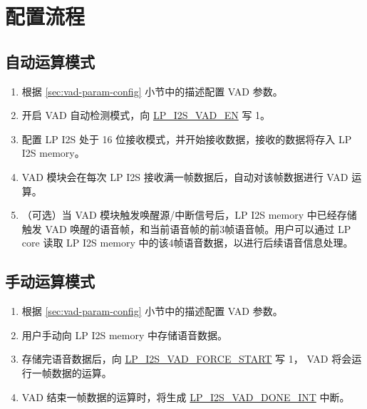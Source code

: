 \documentclass[main\_\_CN.tex]{subfiles}
\begin{document}

\section{配置流程}
\label{sec:vad-prog-procedures}


\subsection{自动运算模式}

\begin{enumerate}
    \item 根据 \ref{sec:vad-param-config} 小节中的描述配置 VAD 参数。
    \item 开启 VAD 自动检测模式，向 \hyperref[fielddesc:LPI2SVADEN]{LP\_I2S\_VAD\_EN} 写 1。
    \item 配置 LP I2S 处于 16 位接收模式，并开始接收数据，接收的数据将存入 LP I2S memory。
    \item VAD 模块会在每次 LP I2S 接收满一帧数据后，自动对该帧数据进行 VAD 运算。
    \item （可选）当 VAD 模块触发唤醒源/中断信号后，LP I2S memory 中已经存储触发 VAD 唤醒的语音帧，和当前语音帧的前3帧语音帧。用户可以通过 LP core 读取 LP I2S memory 中的该4帧语音数据，以进行后续语音信息处理。
\end{enumerate}

\subsection{手动运算模式}
\begin{enumerate}
    \item 根据 \ref{sec:vad-param-config} 小节中的描述配置 VAD 参数。
    \item 用户手动向 LP I2S memory 中存储语音数据。
    \item 存储完语音数据后，向 \hyperref[fielddesc:LPI2SVADFORCESTART]{LP\_I2S\_VAD\_FORCE\_START} 写 1， VAD 将会运行一帧数据的运算。
    \item VAD 结束一帧数据的运算时，将生成 \hyperref[int:LPI2SVADDONEINT]{LP\_I2S\_VAD\_DONE\_INT} 中断。
\end{enumerate}



\end{document}

